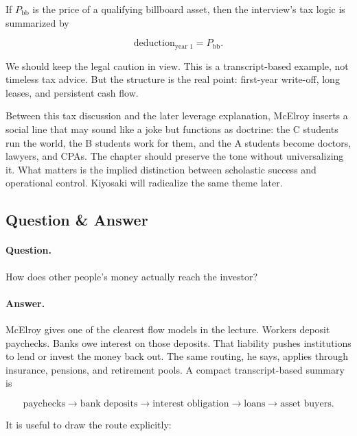 If \(P_{\text{bb}}\) is the price of a qualifying billboard asset, then the interview's tax logic is summarized by

\begin{equation}
\text{deduction}_{\text{year 1}} = P_{\text{bb}}.
\end{equation}

We should keep the legal caution in view. This is a transcript-based example, not timeless tax advice. But the structure is the real point: first-year write-off, long leases, and persistent cash flow.

Between this tax discussion and the later leverage explanation, McElroy inserts a social line that may sound like a joke but functions as doctrine: the C students run the world, the B students work for them, and the A students become doctors, lawyers, and CPAs. The chapter should preserve the tone without universalizing it. What matters is the implied distinction between scholastic success and operational control. Kiyosaki will radicalize the same theme later.

\subsection{Question \& Answer}

\paragraph{Question.} How does other people's money actually reach the investor?

\paragraph{Answer.} McElroy gives one of the clearest flow models in the lecture. Workers deposit paychecks. Banks owe interest on those deposits. That liability pushes institutions to lend or invest the money back out. The same routing, he says, applies through insurance, pensions, and retirement pools. A compact transcript-based summary is

\begin{equation}
\text{paychecks} \to \text{bank deposits} \to \text{interest obligation} \to \text{loans} \to \text{asset buyers}.
\end{equation}

It is useful to draw the route explicitly:

